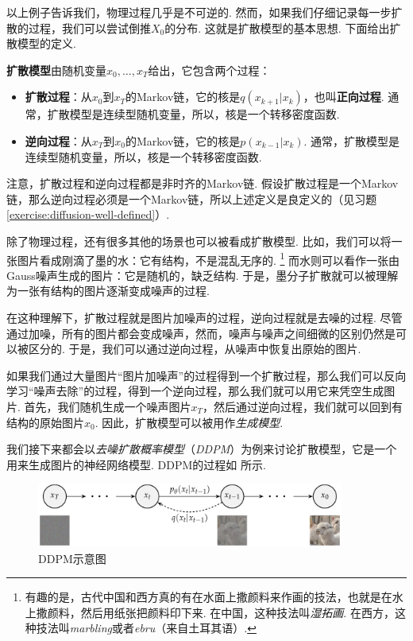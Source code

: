 以上例子告诉我们，物理过程几乎是不可逆的. 然而，如果我们仔细记录每一步扩散的过程，我们可以尝试倒推$X_0$的分布. 这就是扩散模型的基本思想. 下面给出扩散模型的定义.

\begin{definition}[扩散模型]
\textbf{扩散模型}由随机变量$x_0,\dots,x_T$给出，它包含两个过程：
\begin{itemize}
    \item \textbf{扩散过程}：从$x_0$到$x_T$的Markov链，它的核是$q(x_{k+1}|x_k)$，也叫\textbf{正向过程}. 通常，扩散模型是连续型随机变量，所以，核是一个转移密度函数. 
    
    \item \textbf{逆向过程}：从$x_T$到$x_0$的Markov链，它的核是$p(x_{k-1}|x_k)$. 通常，扩散模型是连续型随机变量，所以，核是一个转移密度函数. 
\end{itemize}
\end{definition}

注意，扩散过程和逆向过程都是非时齐的Markov链. 假设扩散过程是一个Markov链，那么逆向过程必须是一个Markov链，所以上述定义是良定义的（见习题 \ref{exercise:diffusion-well-defined}）. 

除了物理过程，还有很多其他的场景也可以被看成扩散模型. 比如，我们可以将一张图片看成刚滴了墨的水：它有结构，不是混乱无序的. \footnote{有趣的是，古代中国和西方真的有在水面上撒颜料来作画的技法，也就是在水上撒颜料，然后用纸张把颜料印下来. 在中国，这种技法叫\textit{湿拓画}. 在西方，这种技法叫\textit{marbling}或者\textit{ebru}（来自土耳其语）. } 而水则可以看作一张由Gauss噪声生成的图片：它是随机的，缺乏结构. 于是，墨分子扩散就可以被理解为一张有结构的图片逐渐变成噪声的过程. 

在这种理解下，扩散过程就是图片加噪声的过程，逆向过程就是去噪的过程. 尽管通过加噪，所有的图片都会变成噪声，然而，噪声与噪声之间细微的区别仍然是可以被区分的. 于是，我们可以通过逆向过程，从噪声中恢复出原始的图片. 

如果我们通过大量图片“图片加噪声”的过程得到一个扩散过程，那么我们可以反向学习“噪声去除”的过程，得到一个逆向过程，那么我们就可以用它来凭空生成图片. 首先，我们随机生成一个噪声图片$x_T$，然后通过逆向过程，我们就可以回到有结构的原始图片$x_0$. 因此，扩散模型可以被用作\textit{生成模型}. 

我们接下来都会以\textit{去噪扩散概率模型}（\textit{DDPM}）为例来讨论扩散模型，它是一个用来生成图片的神经网络模型. DDPM的过程如 所示. 

\begin{figure}[ht]
    \centering
    \includegraphics[width=0.9\textwidth]{figures/Markov-chain/DDPM.pdf}
    \caption{DDPM示意图}\label{fig:DDPM}
\end{figure}

